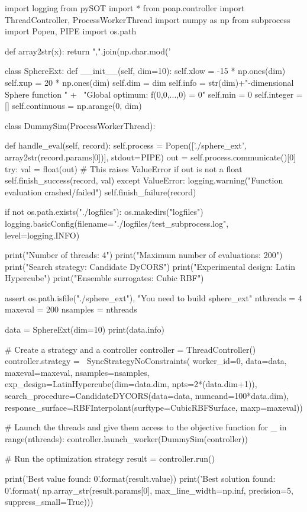 \documentclass[]{article}
\begin{document}
\begin{python}
import logging
from pySOT import *
from poap.controller import ThreadController, ProcessWorkerThread
import numpy as np
from subprocess import Popen, PIPE
import os.path

def array2str(x):
    return ",".join(np.char.mod('%


class SphereExt:
    def __init__(self, dim=10):
        self.xlow = -15 * np.ones(dim)
        self.xup = 20 * np.ones(dim)
        self.dim = dim
        self.info = str(dim)+"-dimensional Sphere function \n" + \
                    "Global optimum: f(0,0,...,0) = 0"
        self.min = 0
        self.integer = []
        self.continuous = np.arange(0, dim)


class DummySim(ProcessWorkerThread):

    def handle_eval(self, record):
        self.process = Popen(['./sphere_ext', array2str(record.params[0])],
                             stdout=PIPE)
        out = self.process.communicate()[0]
        try:
            val = float(out)  # This raises ValueError if out is not a float
            self.finish_success(record, val)
        except ValueError:
            logging.warning("Function evaluation crashed/failed")
            self.finish_failure(record)

if not os.path.exists("./logfiles"):
    os.makedirs("logfiles")
logging.basicConfig(filename="./logfiles/test_subprocess.log",
                    level=logging.INFO)

print("Number of threads: 4")
print("Maximum number of evaluations: 200")
print("Search strategy: Candidate DyCORS")
print("Experimental design: Latin Hypercube")
print("Ensemble surrogates: Cubic RBF")

assert os.path.isfile("./sphere_ext"), "You need to build sphere_ext"
nthreads = 4
maxeval = 200
nsamples = nthreads

data = SphereExt(dim=10)
print(data.info)

# Create a strategy and a controller
controller = ThreadController()
controller.strategy = \
    SyncStrategyNoConstraints(
        worker_id=0, data=data,
        maxeval=maxeval, nsamples=nsamples,
        exp_design=LatinHypercube(dim=data.dim, npts=2*(data.dim+1)),
        search_procedure=CandidateDYCORS(data=data, numcand=100*data.dim),
        response_surface=RBFInterpolant(surftype=CubicRBFSurface, maxp=maxeval))
            
# Launch the threads and give them access to the objective function
for _ in range(nthreads):
    controller.launch_worker(DummySim(controller))

# Run the optimization strategy
result = controller.run()

print('Best value found: {0}'.format(result.value))
print('Best solution found: {0}'.format(
    np.array_str(result.params[0], max_line_width=np.inf,
                 precision=5, suppress_small=True)))
\end{python}
\end{document}
